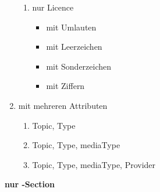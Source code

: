 \begin{enumerate}
\begin{enumerate}
        \item nur Licence
        \begin{itemize}
           \item mit Umlauten
           \item mit Leerzeichen
           \item mit Sonderzeichen
           \item mit Ziffern
        \end{itemize}
    \end{enumerate} %
    \item mit mehreren Attributen
    \begin{enumerate}
        \item Topic, Type
	     \item Topic, Type, mediaType
	     \item Topic, Type, mediaType, Provider
     \end{enumerate}
  \end{enumerate} %



\pagebreak


\flushleft \textbf{nur \SEARCH-Section}

